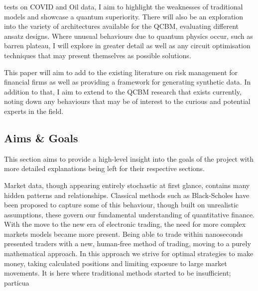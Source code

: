 \documentclass[12pt]{article}
\newcommand{\newp}
    {
    \vskip 0.5cm 
  }
\numberwithin{equation}{section}
\begin{document}
tests on COVID and Oil data, I aim to highlight the weaknesses of traditional models 
and showcase a quantum superiority.
There will also be an exploration into the variety of architectures 
available for the QCBM, evaluating different ansatz designs. Where unusual behaviours
due to quantum physics occur, such as barren plateau, I will explore in greater detail 
as well as any circuit optimisation techniques that may present themselves as 
possible solutions. 
\newp
This paper will aim to add to the existing literature on risk management for 
financial firms as well as providing a framework for generating synthetic 
data. In addition to that, I aim to extend to the QCBM research that exists 
currently, noting down any behaviours that may be of interest to the curious 
and potential 
experts in the field. 
\clearpage
\subsection{Aims \& Goals}
This section aims to provide a high-level insight into the goals of the 
project with more detailed explanations being left for their respective sections. 
\newp 
Market data, though appearing entirely stochastic at first glance, contains many 
hidden patterns and relationships. Classical methods such as Black-Scholes  
\autocite{blackscholes} have been proposed to capture some of this behaviour, 
though built on unrealistic assumptions, these govern 
our fundamental understanding of quantitative finance. With the move to the new era 
of electronic trading, the need for more complex markets models became more present.
Being able to trade within nanoseconds presented traders with a new, human-free method 
of trading, moving to a purely mathematical approach. In this approach we strive
for optimal strategies to make money, taking calculated positions and limiting 
exposure to large market movements. It is here where traditional methods started 
to be insufficient; particua
\clearpage 
\end{document}
